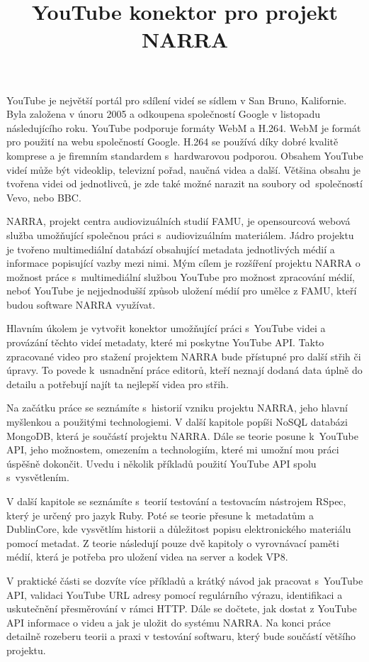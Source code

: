 \documentclass[thesis=B,czech]{FITthesis}[2012/06/26]
\title{YouTube konektor pro projekt NARRA}
\begin{document}

\begin{introduction}
\par YouTube\cite{yout} je největší portál pro sdílení videí se sídlem v San Bruno, Kalifornie. Byla založena v únoru 2005 a odkoupena společností Google v listopadu následujícího roku. YouTube podporuje formáty WebM a H.264. WebM\cite{webm} je formát pro použití na webu společností Google. H.264 se používá díky dobré kvalitě komprese a je firemním standardem s~hardwarovou podporou. Obsahem YouTube videí může být videoklip, televizní pořad, naučná videa a další. Většina obsahu je tvořena videi od jednotlivců, je zde také možné narazit na soubory od~společností Vevo, nebo BBC.
\par NARRA\cite{narra}, projekt centra audiovizuálních studií FAMU, je opensourcová webová služba umožňující společnou práci s~audiovizuálním materiálem. Jádro projektu je tvořeno multimediální databází obsahující metadata jednotlivých médií a informace popisující vazby mezi nimi. Mým cílem je rozšíření projektu NARRA o možnost práce s~multimediální službou YouTube pro možnost zpracování médií, neboť YouTube je nejjednodušší způsob uložení médií pro umělce z FAMU, kteří budou software NARRA využívat.
\par Hlavním úkolem je vytvořit konektor umožňující práci s~YouTube videi a provázání těchto videí metadaty, které mi poskytne YouTube API. Takto zpracované video pro stažení projektem NARRA bude přístupné pro další střih či úpravy. To povede k~usnadnění práce editorů, kteří neznají dodaná data úplně do detailu a potřebují najít ta nejlepší videa pro střih. 
\par Na začátku práce se seznámíte s~historií vzniku projektu NARRA, jeho hlavní myšlenkou a použitými technologiemi. V další kapitole popíši NoSQL databázi MongoDB, která je součástí projektu NARRA. Dále se teorie posune k~YouTube API, jeho možnostem, omezením a technologiím, které mi umožní mou práci úspěšně dokončit. Uvedu i několik příkladů použití YouTube API spolu s~vysvětlením.
\par V další kapitole se seznámíte s~teorií testování a testovacím nástrojem RSpec, který je určený pro jazyk Ruby. Poté se teorie přesune k~metadatům a DublinCore, kde vysvětlím historii a důležitost popisu elektronického materiálu pomocí metadat. Z teorie následují pouze dvě kapitoly o vyrovnávací paměti médií, která je potřeba pro uložení videa na server a kodek VP8.
\par V praktické části se dozvíte více příkladů a krátký návod jak pracovat s~YouTube API, validaci YouTube URL adresy pomocí regulárního výrazu, identifikaci a uskutečnění přesměrování v rámci HTTP. Dále se dočtete, jak dostat z YouTube API informace o videu a jak je uložit do systému NARRA. Na konci práce detailně rozeberu teorii a praxi v testování softwaru, který bude součástí většího projektu.
\end{introduction}
\end{document}
